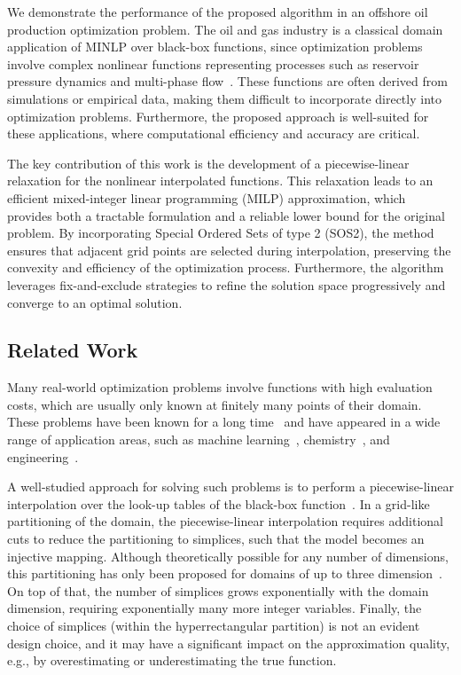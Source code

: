 \documentclass[pdflatex,sn-mathphys-num]{sn-jnl}%
\begin{document}
We demonstrate the performance of the proposed algorithm in an offshore oil production optimization problem.
The oil and gas industry is a classical domain application of MINLP over black-box functions, since optimization problems involve complex nonlinear functions representing processes such as reservoir pressure dynamics and multi-phase flow~\citep{beale_mathematical_1983}.
These functions are often derived from simulations or empirical data, making them difficult to incorporate directly into optimization problems.
Furthermore, the proposed approach is well-suited for these applications, where computational efficiency and accuracy are critical.

The key contribution of this work is the development of a piecewise-linear relaxation for the nonlinear interpolated functions. This relaxation leads to an efficient mixed-integer linear programming (MILP) approximation, which provides both a tractable formulation and a reliable lower bound for the original problem. By incorporating Special Ordered Sets of type 2 (SOS2), the method ensures that adjacent grid points are selected during interpolation, preserving the convexity and efficiency of the optimization process. Furthermore, the algorithm leverages fix-and-exclude strategies to refine the solution space progressively and converge to an optimal solution.



\subsection{Related Work}

Many real-world optimization problems involve functions with high evaluation costs, which are usually only known at finitely many points of their domain.
These problems have been known for a long time~\citep{jonesEfficientGlobalOptimization1998} and have appeared in a wide range of application areas, such as machine learning~\citep{bischlHyperparameterOptimizationFoundations2023}, chemistry~\citep{shieldsBayesianReactionOptimization2021}, and engineering~\citep{raoEngineeringOptimizationTheory2019a}.

A well-studied approach for solving such problems is to perform a piecewise-linear interpolation over the look-up tables of the black-box function~\citep{vielma2010modeling,Silva:EJOR:2014,huchette2022piecewise}.
In a grid-like partitioning of the domain, the piecewise-linear interpolation requires additional cuts to reduce the partitioning to simplices, such that the model becomes an injective mapping.
Although theoretically possible for any number of dimensions, this partitioning has only been proposed for domains of up to three dimension~\citep{misenerPiecewiseLinearApproximationsMultidimensional2010}.
On top of that, the number of simplices grows exponentially with the domain dimension, requiring exponentially many more integer variables.
Finally, the choice of simplices (within the hyperrectangular partition) is not an evident design choice, and it may have a significant impact on the approximation quality, e.g., by overestimating or underestimating the true function.
\end{document}

